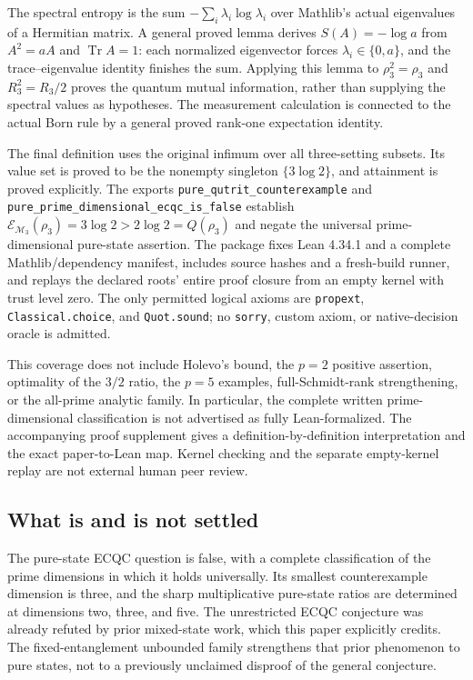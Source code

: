 \documentclass[11pt]{article}
\theoremstyle{remark}
\newcommand{\E}{\mathcal E}
\newcommand{\M}{\mathcal M}
\DeclareMathOperator{\Tr}{Tr}
\begin{document}
The spectral entropy is the sum $-\sum_i\lambda_i\log\lambda_i$ over Mathlib's actual eigenvalues of a Hermitian matrix. A general proved lemma derives $S(A)=-\log a$ from $A^2=aA$ and $\Tr A=1$: each normalized eigenvector forces $\lambda_i\in\{0,a\}$, and the trace--eigenvalue identity finishes the sum. Applying this lemma to $\rho_3^2=\rho_3$ and $R_3^2=R_3/2$ proves the quantum mutual information, rather than supplying the spectral values as hypotheses. The measurement calculation is connected to the actual Born rule by a general proved rank-one expectation identity.

The final definition uses the original infimum over all three-setting subsets. Its value set is proved to be the nonempty singleton $\{3\log2\}$, and attainment is proved explicitly. The exports \texttt{pure\_qutrit\_counterexample} and \texttt{pure\_prime\_dimensional\_ecqc\_is\_false} establish $\E_{\M_3}(\rho_3)=3\log2>2\log2=Q(\rho_3)$ and negate the universal prime-dimensional pure-state assertion. The package fixes Lean 4.34.1 and a complete Mathlib/dependency manifest, includes source hashes and a fresh-build runner, and replays the declared roots' entire proof closure from an empty kernel with trust level zero. The only permitted logical axioms are \texttt{propext}, \texttt{Classical.choice}, and \texttt{Quot.sound}; no \texttt{sorry}, custom axiom, or native-decision oracle is admitted.

This coverage does not include Holevo's bound, the $p=2$ positive assertion, optimality of the $3/2$ ratio, the $p=5$ examples, full-Schmidt-rank strengthening, or the all-prime analytic family. In particular, the complete written prime-dimensional classification is not advertised as fully Lean-formalized. The accompanying proof supplement gives a definition-by-definition interpretation and the exact paper-to-Lean map. Kernel checking and the separate empty-kernel replay are not external human peer review.

\subsection{What is and is not settled}
The pure-state ECQC question is false, with a complete classification of the prime dimensions in which it holds universally. Its smallest counterexample dimension is three, and the sharp multiplicative pure-state ratios are determined at dimensions two, three, and five. The unrestricted ECQC conjecture was already refuted by prior mixed-state work, which this paper explicitly credits. The fixed-entanglement unbounded family strengthens that prior phenomenon to pure states, not to a previously unclaimed disproof of the general conjecture.
\end{document}
